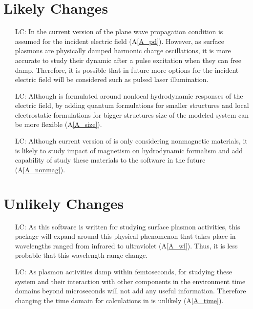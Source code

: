 \documentclass[12pt]{article}
\newcounter{lcnum} %
\begin{document}
	
	\section{Likely Changes}
	
	\noindent \begin{itemize}
		
		\item[LC\refstepcounter{lcnum}\thelcnum\label{LC_lightsource}:] In the current
		version of the \progname{} plane wave propagation condition is assumed for the
		incident electric field (A\ref{A_pd}). However, as surface plasmons are
		physically damped harmonic charge oscillations, it is more accurate to study
		their dynamic after a pulse excitation when they can free damp. Therefore, it is
		possible that in future more options for the incident electric field will be
		considered such as pulsed laser illumination.
		
		\item[LC\refstepcounter{lcnum}\thelcnum\label{LC_size}:] Although \progname{} is
		formulated around nonlocal hydrodynamic responses of the electric field, by
		adding quantum formulations for smaller structures and local electrostatic
		formulations for bigger structures size of the modeled system can be more
		flexible (A\ref{A_size}).
		
		
		\item[LC\refstepcounter{lcnum}\thelcnum\label{LC_magnetism}:] Although current
		version of \progname{} is only considering nonmagnetic materials, it is likely
		to study impact of magnetism on hydrodynamic formalism and add capability of
		study these materials to the software in the future (A\ref{A_nonmag}).
		
	\end{itemize}
	
	\section{Unlikely Changes}
	
	\noindent \begin{itemize}
		
		\item[LC\refstepcounter{lcnum}\thelcnum\label{LC_wavelength}:] As this software
		is written for studying surface plasmon activities, this package will expand
		around this physical phenomenon that takes place in wavelengths ranged from
		infrared to ultraviolet (A\ref{A_wl}). Thus, it is less probable that this
		wavelength range change.
		
		\item[LC\refstepcounter{lcnum}\thelcnum\label{LC_time}:] As plasmon activities
		damp within femtoseconds, for studying these system and their interaction with
		other components in the environment time domains beyond microseconds will not
		add any useful information. Therefore changing the time domain for calculations
		in is unlikely (A\ref{A_time}).
		
	\end{itemize}
	
\end{document}
